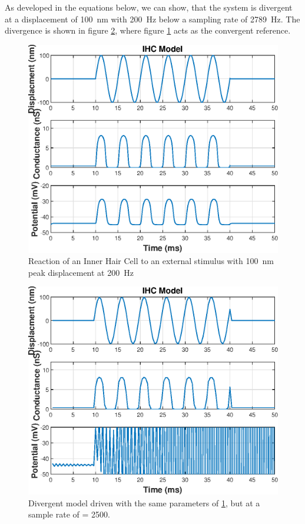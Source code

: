 \clearpage
\subsubsection{}
As developed in the equations below, we can show, that the system is divergent at a displacement of \SI{100}{\nano\meter} with \SI{200}{\hertz} below a sampling rate of \SI{2789}{\hertz}. The divergence is shown in figure \ref{fig:signal:200Hz_100nm_divergent}, where figure \ref{fig:signal:200Hz_100nm} acts as the convergent reference. 

\begin{figure}[h] 
  \centering
  \includegraphics[width=.5\linewidth]{ue3/200Hz_100nm.eps} %
  \caption{Reaction of an Inner Hair Cell to an external stimulus with \SI{100}{\nano\meter} peak displacement at \SI{200}{\hertz}}
  \label{fig:signal:200Hz_100nm}
\end{figure}

\begin{figure}[h] 
  \centering
  \includegraphics[width=.5\linewidth]{ue3/200Hz_100nm_non_convergent.eps} %
  \caption{Divergent model driven with the same parameters of \ref{fig:signal:200Hz_100nm}, but at a sample rate of = 2500.}
  \label{fig:signal:200Hz_100nm_divergent}
\end{figure}


